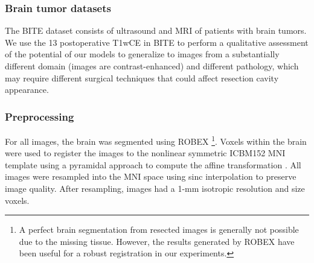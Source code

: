 \subsubsection{Brain tumor datasets}

The \ac{BITE} dataset \cite{mercier_online_2012} consists of ultrasound and \ac{MRI} of patients with brain tumors.
We use the 13 postoperative \ac{T1wCE} in \ac{BITE} to perform a qualitative assessment of the potential of our models to generalize to images from a substantially different domain (images are contrast-enhanced) and different pathology, which may require different surgical techniques that could affect resection cavity appearance.



\subsubsection{Preprocessing}
\label{sec:preprocessing}

For all images, the brain was segmented using ROBEX \cite{iglesias_robust_2011}%
\footnote{A perfect brain segmentation from resected images is generally not possible due to the missing tissue.
However, the results generated by ROBEX have been useful for a robust registration in our experiments.}.
Voxels within the brain were used to register the images to the nonlinear symmetric ICBM152 \ac{MNI} template \cite{fonov_unbiased_2009,fonov_unbiased_2011} using a pyramidal approach to compute the affine transformation \cite{modat_global_2014}.
All images were resampled into the \ac{MNI} space using sinc interpolation to preserve image quality.
After resampling, images had a 1-mm isotropic resolution and size  voxels.
